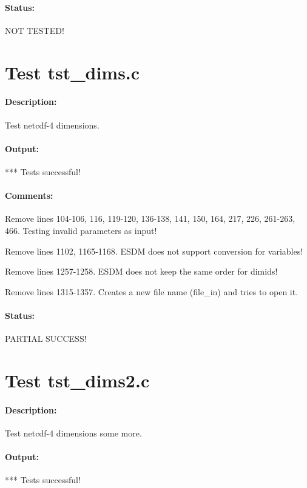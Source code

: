\paragraph{Status:} NOT TESTED!

\section{Test tst\_dims.c}

\paragraph{Description:} Test netcdf-4 dimensions.

\paragraph{Output:} *** Tests successful!

\paragraph{Comments:} Remove lines 104-106, 116, 119-120, 136-138, 141, 150, 164, 217, 226, 261-263, 466. Testing invalid parameters as input!

Remove lines 1102, 1165-1168. ESDM does not support conversion for variables!

Remove lines 1257-1258. ESDM does not keep the same order for dimids!

Remove lines 1315-1357. Creates a new file name (file\_in) and tries to open it.

\paragraph{Status:} PARTIAL SUCCESS!

\section{Test tst\_dims2.c}

\paragraph{Description:} Test netcdf-4 dimensions some more.

\paragraph{Output:} *** Tests successful!

